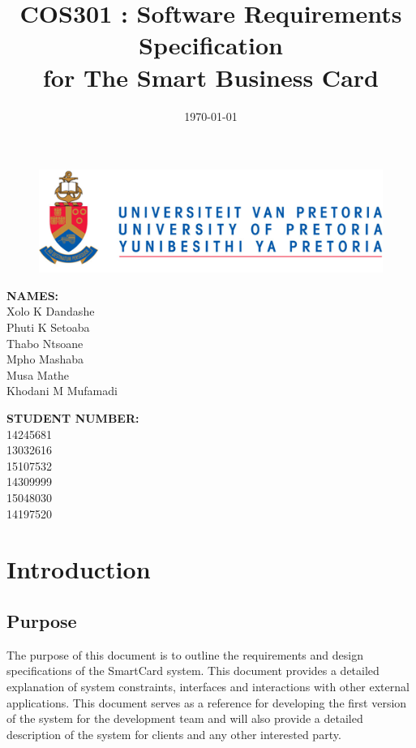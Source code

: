 \documentclass[english]{article}
\title{COS301 : Software Requirements Specification\\
	for The Smart Business Card\\
	}
\date{\today}
\begin{document}
	\maketitle
	\begin{figure}[!t]
		\includegraphics{up_logo.png}
	\end{figure}
	\begin{minipage}{0.4\textwidth}
		\begin{flushleft} \large
			\textbf{NAMES:}\\[0.4cm]
			Xolo K Dandashe\\
			Phuti K Setoaba\\
			Thabo Ntsoane\\
			Mpho Mashaba\\	
			Musa Mathe\\
			Khodani M Mufamadi

		\end{flushleft}
	\end{minipage}
	\begin{minipage}{0.4\textwidth}
		\begin{flushright} \large
			\textbf{STUDENT NUMBER:} \\[0.4cm]
		 	14245681\\ 	
		 	13032616\\		
		 	15107532\\	
		 	14309999\\		
		 	15048030\\	
		 	14197520
		\end{flushright}
	\end{minipage}


	
	\newpage

	\tableofcontents
	\newpage

	

	\section{Introduction}
			

		\subsection{Purpose}
			The purpose of this document is to outline the requirements and design specifications of the SmartCard system. This document provides a detailed explanation of system constraints, interfaces and interactions with other external applications. This document serves as a reference for developing the first version of the system for the development team and will also provide a detailed description of the system for clients and any other interested party.
\end{document}
